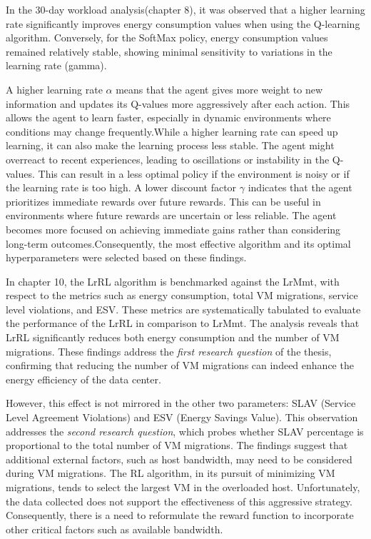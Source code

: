 \documentclass[a4paper,12pt]{Classes/RoboticsLaTeX}
\begin{document}
        In the 30-day workload analysis(chapter 8), it was observed that a higher learning rate significantly improves energy consumption values when using the Q-learning algorithm. Conversely, for the SoftMax policy, energy consumption values remained relatively stable, showing minimal sensitivity to variations in the learning rate (gamma).

        A higher learning rate $\alpha$ means that the agent gives more weight to new information and updates its Q-values more aggressively after each action. This allows the agent to learn faster, especially in dynamic environments where conditions may change frequently.While a higher learning rate can speed up learning, it can also make the learning process less stable. The agent might overreact to recent experiences, leading to oscillations or instability in the Q-values. This can result in a less optimal policy if the environment is noisy or if the learning rate is too high. A lower discount factor $\gamma$ indicates that the agent prioritizes immediate rewards over future rewards. This can be useful in environments where future rewards are uncertain or less reliable. The agent becomes more focused on achieving immediate gains rather than considering long-term outcomes.Consequently, the most effective algorithm and its optimal hyperparameters were selected based on these findings.
        
        In chapter 10, the LrRL algorithm is benchmarked against the LrMmt, with respect to the  metrics such as energy consumption, total VM migrations, service level violations, and ESV. These metrics are systematically tabulated to evaluate the performance of the LrRL in comparison to LrMmt. The analysis reveals that LrRL significantly reduces both energy consumption and the number of VM migrations. These findings address the \textit{first research question} of the thesis, confirming that reducing the number of VM migrations can indeed enhance the energy efficiency of the data center.
        
        However, this effect is not mirrored in the other two parameters: SLAV (Service Level Agreement Violations) and ESV (Energy Savings Value). This observation addresses the \textit{second research question}, which probes whether SLAV percentage is proportional to the total number of VM migrations. The findings suggest that additional external factors, such as host bandwidth, may need to be considered during VM migrations. The RL algorithm, in its pursuit of minimizing VM migrations, tends to select the largest VM in the overloaded host. Unfortunately, the data collected does not support the effectiveness of this aggressive strategy. Consequently, there is a need to reformulate the reward function to incorporate other critical factors such as available bandwidth.
        
\end{document}
